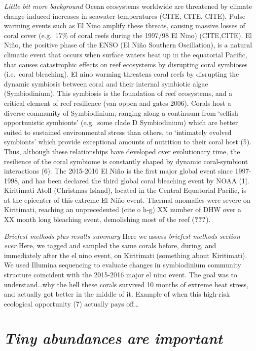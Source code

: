 \documentclass[]{article}
\begin{document}
\emph{Little bit more background} Ocean ecosystems worldwide are
threatened by climate change-induced increases in seawater temperatures
(CITE, CITE, CITE). Pulse warming events such as El Nino amplify these
threats, causing massive losses of coral cover (e.g.~17\% of coral reefs
during the 1997/98 El Nino) (CITE,CITE). El Niño, the positive phase of
the ENSO (El Niño Southern Oscillation), is a natural climatic event
that occurs when surface waters heat up in the equatorial Pacific, that
causes catastrophic effects on reef ecosystems by disrupting coral
symbioses (i.e.~coral bleaching). El nino warming threatens coral reefs
by disrupting the dynamic symbiosis between coral and their internal
symbiotic algae (Symbiodinium). This symbiosis is the foundation of reef
ecosystems, and a critical element of reef resilience (van oppen and
gates 2006). Corals host a diverse community of Symbiodinium, ranging
along a continuum from `selfish opportunistic symbionts' (e.g.~some
clade D Symbiodinium) which are better suited to sustained environmental
stress than others, to `intimately evolved symbionts' which provide
exceptional amounts of nutrition to their coral host (5). Thus, although
these relationships have developed over evolutionary time, the
resilience of the coral symbiome is constantly shaped by dynamic
coral-symbiont interactions (6). The 2015-2016 El Niño is the first
major global event since 1997-1998, and has been declared the third
global coral bleaching event by NOAA (1). Kiritimati Atoll (Christmas
Island), located in the Central Equatorial Pacific, is at the epicenter
of this extreme El Niño event. Thermal anomalies were severe on
Kiritimati, reaching an unprecedented (cite o h-g) XX number of DHW over
a XX month long bleaching event, demolishing most of the reef
(\textbf{???}).

\emph{Briefest methods plus results summary} Here we assess
\emph{briefest methods section ever} Here, we tagged and sampled the
same corals before, during, and immediately after the el nino event, on
Kiritimati (something about Kiritimati). We used Illumina sequencing to
evaluate changes in symbiodinium community structure coincident with the
2015-2016 major el nino event. The goal was to understand\ldots{}why the
hell these corals survived 10 months of extreme heat stress, and
actually got better in the middle of it. Example of when this high-risk
ecological opportunity (7) actually pays off\ldots{}

\section{\texorpdfstring{\emph{Tiny abundances are
important}}{Tiny abundances are important}}\label{tiny-abundances-are-important}
\end{document}
